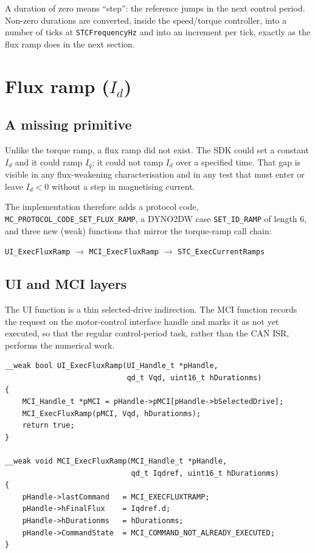 A duration of zero means ``step'': the reference jumps in the next control
period. Non-zero durations are converted, inside the speed/torque
controller, into a number of ticks at \texttt{STCFrequencyHz} and into an
increment per tick, exactly as the flux ramp does in the next section.

\section{Flux ramp ($I_d$)}
\label{sec:id-ramp}

\subsection{A missing primitive}
Unlike the torque ramp, a flux ramp did not exist. The SDK could set a
constant $I_d$ and it could ramp $I_q$; it could not ramp $I_d$ over a
specified time. That gap is visible in any flux-weakening characterisation
and in any test that must enter or leave $I_d < 0$ without a step in
magnetising current.

The implementation therefore adds a protocol code,
\texttt{MC\_PROTOCOL\_CODE\_SET\_FLUX\_RAMP}, a DYNO2DW case
\texttt{SET\_ID\_RAMP} of length 6, and three new (weak) functions that
mirror the torque-ramp call chain:

\begin{center}
\texttt{UI\_ExecFluxRamp} $\rightarrow$
\texttt{MCI\_ExecFluxRamp} $\rightarrow$
\texttt{STC\_ExecCurrentRamps}
\end{center}

\subsection{UI and MCI layers}
The UI function is a thin selected-drive indirection. The MCI function
records the request on the motor-control interface handle and marks it as
not yet executed, so that the regular control-period task, rather than the
CAN ISR, performs the numerical work.

\begin{lstlisting}[style=cstyle,caption={UI and MCI entry points of the flux ramp.},label=lst:flux-ui]
__weak bool UI_ExecFluxRamp(UI_Handle_t *pHandle,
                            qd_t Vqd, uint16_t hDurationms)
{
    MCI_Handle_t *pMCI = pHandle->pMCI[pHandle->bSelectedDrive];
    MCI_ExecFluxRamp(pMCI, Vqd, hDurationms);
    return true;
}

__weak void MCI_ExecFluxRamp(MCI_Handle_t *pHandle,
                             qd_t Iqdref, uint16_t hDurationms)
{
    pHandle->lastCommand   = MCI_EXECFLUXTRAMP;
    pHandle->hFinalFlux    = Iqdref.d;
    pHandle->hDurationms   = hDurationms;
    pHandle->CommandState  = MCI_COMMAND_NOT_ALREADY_EXECUTED;
}
\end{lstlisting}

